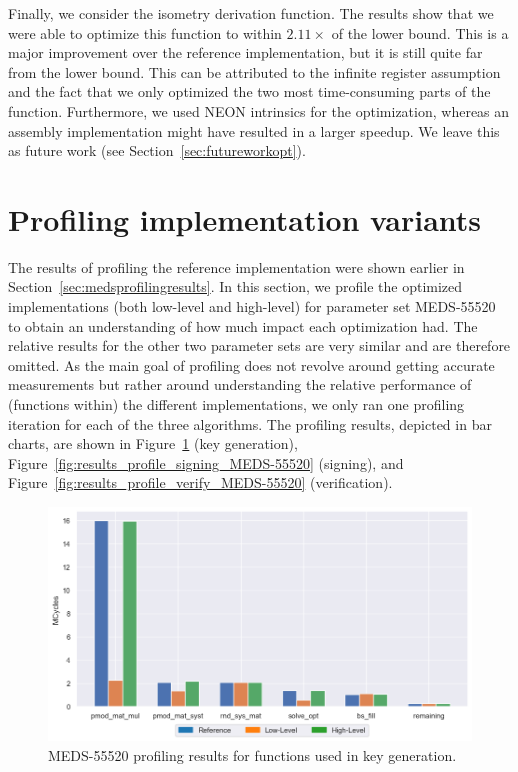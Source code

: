 \documentclass[11pt,a4paper]{report}
\theoremstyle{definition}
\begin{document}
Finally, we consider the isometry derivation function. The results show that we were able to optimize this function to within $2.11\times$ of the lower bound. This is a major improvement over the reference implementation, but it is still quite far from the lower bound. This can be attributed to the infinite register assumption and the fact that we only optimized the two most time-consuming parts of the function. Furthermore, we used NEON intrinsics for the optimization, whereas an assembly implementation might have resulted in a larger speedup. We leave this as future work (see Section~\ref{sec:futureworkopt}).

\section{Profiling implementation variants}
\label{sec:profilingoptimizations}
The results of profiling the reference implementation were shown earlier in Section~\ref{sec:medsprofilingresults}. In this section, we profile the optimized implementations (both low-level and high-level) for parameter set MEDS-55520 to obtain an understanding of how much impact each optimization had. The relative results for the other two parameter sets are very similar and are therefore omitted. As the main goal of profiling does not revolve around getting accurate measurements but rather around understanding the relative performance of (functions within) the different implementations, we only ran one profiling iteration for each of the three algorithms. The profiling results, depicted in bar charts, are shown in Figure~\ref{fig:results_profile_keygen_MEDS-55520} (key generation), Figure~\ref{fig:results_profile_signing_MEDS-55520} (signing), and Figure~\ref{fig:results_profile_verify_MEDS-55520} (verification).

\begin{figure}
  \centering
  \includegraphics[width=\textwidth]{plots/barplot_MEDS-55520_profile_keygen.png}
  \caption{MEDS-55520 profiling results for functions used in key generation.}
  \label{fig:results_profile_keygen_MEDS-55520}
\end{figure}
\end{document}
